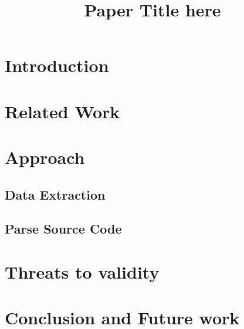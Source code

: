 \documentclass[conference]{IEEEtran}
\begin{document}
\title{Paper Title here}

\author{

}

\maketitle

\begin{abstract}

\end{abstract}

\IEEEpeerreviewmaketitle

\section{Introduction}
\label{sec:introduction}

\section{Related Work}
\label{sec:related_work}




\section{Approach}
\label{sec:approach}

 
\subsection{Data Extraction}
 
\subsection{Parse Source Code}

\section{Threats to validity}
\label{sec:threats_to_validity}

\section{Conclusion and Future work}
\label{sec:conclusion}



\end{document}
